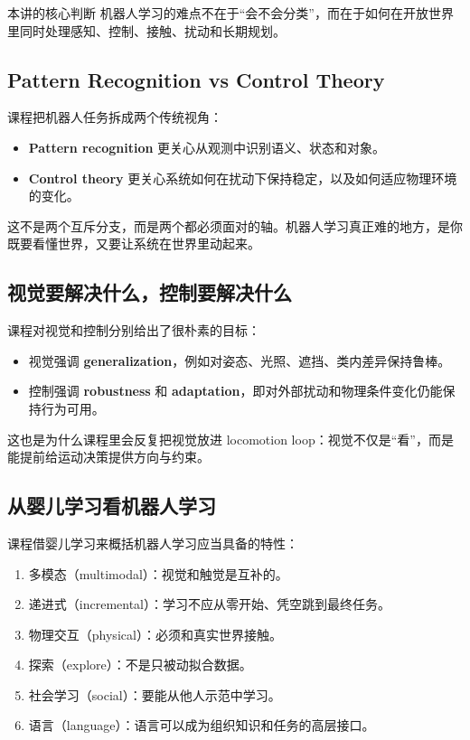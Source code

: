 \documentclass[a4paper]{article}
\begin{document}
\begin{importantbox}{本讲的核心判断}
机器人学习的难点不在于“会不会分类”，而在于如何在开放世界里同时处理感知、控制、接触、扰动和长期规划。
\end{importantbox}

\subsection{Pattern Recognition vs Control Theory}
课程把机器人任务拆成两个传统视角：
\begin{itemize}
    \item \textbf{Pattern recognition} 更关心从观测中识别语义、状态和对象。
    \item \textbf{Control theory} 更关心系统如何在扰动下保持稳定，以及如何适应物理环境的变化。
\end{itemize}
这不是两个互斥分支，而是两个都必须面对的轴。机器人学习真正难的地方，是你既要看懂世界，又要让系统在世界里动起来。

\subsection{视觉要解决什么，控制要解决什么}
课程对视觉和控制分别给出了很朴素的目标：
\begin{itemize}
    \item 视觉强调 \textbf{generalization}，例如对姿态、光照、遮挡、类内差异保持鲁棒。
    \item 控制强调 \textbf{robustness} 和 \textbf{adaptation}，即对外部扰动和物理条件变化仍能保持行为可用。
\end{itemize}
这也是为什么课程里会反复把视觉放进 locomotion loop：视觉不仅是“看”，而是能提前给运动决策提供方向与约束。

\subsection{从婴儿学习看机器人学习}
课程借婴儿学习来概括机器人学习应当具备的特性：
\begin{enumerate}
    \item 多模态（multimodal）：视觉和触觉是互补的。
    \item 递进式（incremental）：学习不应从零开始、凭空跳到最终任务。
    \item 物理交互（physical）：必须和真实世界接触。
    \item 探索（explore）：不是只被动拟合数据。
    \item 社会学习（social）：要能从他人示范中学习。
    \item 语言（language）：语言可以成为组织知识和任务的高层接口。
\end{enumerate}
\end{document}
